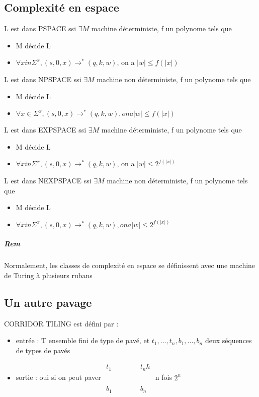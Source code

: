 \documentclass[10pt,a4paper]{article}
\begin{document}
\subsection{Complexité en espace}
\begin{definition}{}L est dans PSPACE ssi $\exists M$ machine déterministe, f un polynome tels que \begin{itemize}
\item M décide L
\item $\forall x in \Sigma^x, (s,0,x) \rightarrow^* (q, k, w)$, on a $|w| \leq f(|x|)$
\end{itemize}\end{definition}
\begin{definition}{}L est dans NPSPACE ssi $\exists M$ machine non déterministe, f un polynome tels que \begin{itemize}
\item M décide L
\item $\forall x \in \Sigma^x, (s,0,x) \rightarrow^* (q, k, w), on a |w| \leq f(|x|)$
\end{itemize}\end{definition}
\begin{definition}{}L est dans EXPSPACE ssi $\exists M$ machine déterministe, f un polynome tels que \begin{itemize}
\item M décide L
\item $\forall x in \Sigma^x, (s,0,x) \rightarrow^* (q, k, w)$, on a $|w| \leq 2^{f(|x|)}$
\end{itemize}\end{definition}
\begin{definition}{}L est dans NEXPSPACE ssi $\exists M$ machine non déterministe, f un polynome tels que \begin{itemize}
\item M décide L
\item $\forall x in \Sigma^x, (s,0,x) \rightarrow^* (q, k, w), on a |w| \leq 2^{f(|x|)}$
\end{itemize}\end{definition}
\subparagraph*{Rem} Normalement, les classes de complexité en espace se définissent avec une machine de Turing à plusieurs rubans

\subsection{Un autre pavage}
CORRIDOR TILING est défini par :
\begin{itemize}
\item entrée : T ensemble fini de type de pavé, et $t_1, ..., t_n, b_1, ..., b_n$ deux séquences de types de pavés
\item sortie : oui si on peut paver 
$\begin{array}{c|c|c|c|c|c}
t_1 & & & & & t_n \hbar \\
& & & & & \\
& & & & & \\
& & & & & \\
& & & & & \\
b_1 & & & & & b_n
\end{array}$ n fois $2^n$
\end{itemize}
\end{document}
